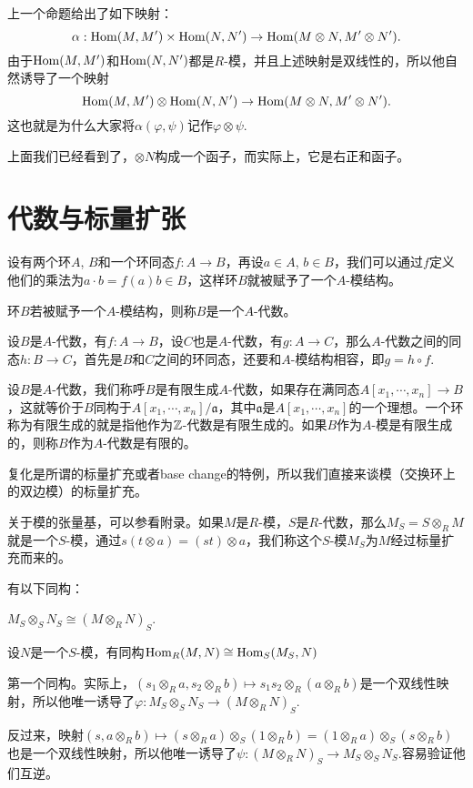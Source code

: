 \para 上一个命题给出了如下映射：
\[
	\alpha:\operatorname{Hom}(M,M')\times \operatorname{Hom}(N,N')\to \operatorname{Hom}(M\otimes N,M'\otimes N').
\]
由于$\operatorname{Hom}(M,M')$和$\operatorname{Hom}(N,N')$都是$R$-模，并且上述映射是双线性的，所以他自然诱导了一个映射
\[
	\operatorname{Hom}(M,M')\otimes \operatorname{Hom}(N,N')\to \operatorname{Hom}(M\otimes N,M'\otimes N').
\]
这也就是为什么大家将$\alpha(\varphi,\psi)$记作$\varphi\otimes \psi$. 

\para 上面我们已经看到了，$\otimes N$构成一个函子，而实际上，它是右正和函子。

\section{代数与标量扩张}

设有两个环$A$, $B$和一个环同态$f:A\to B$，再设$a\in A$, $b\in B$，我们可以通过$f$定义他们的乘法为$a\cdot b=f(a)b\in B$，这样环$B$就被赋予了一个$A$-模结构。

\para 环$B$若被赋予一个$A$-模结构，则称$B$是一个$A$-代数。

设$B$是$A$-代数，有$f:A\to B$，设$C$也是$A$-代数，有$g:A\to C$，那么$A$-代数之间的同态$h:B\to C$，首先是$B$和$C$之间的环同态，还要和$A$-模结构相容，即$g=h\circ f$.

\para 设$B$是$A$-代数，我们称呼$B$是有限生成$A$-代数，如果存在满同态$A[x_1,\cdots ,x_n]\to B$，这就等价于$B$同构于$A[x_1,\cdots ,x_n]/\mathfrak{a}$，其中$\mathfrak{a}$是$A[x_1,\cdots ,x_n]$的一个理想。一个环称为有限生成的就是指他作为$\mathbb{Z}$-代数是有限生成的。如果$B$作为$A$-模是有限生成的，则称$B$作为$A$-代数是有限的。

复化是所谓的标量扩充或者base change的特例，所以我们直接来谈模（交换环上的双边模）的标量扩充。

\para 关于模的张量基，可以参看附录。如果$M$是$R$-模，$S$是$R$-代数，那么$M_S=S\otimes_R M$就是一个$S$-模，通过$s(t\otimes a)=(st)\otimes a$，我们称这个$S$-模$M_S$为$M$经过标量扩充而来的。

\lem 有以下同构：

 $M_S\otimes_S N_S\cong (M\otimes_R N)_S$.

 设$N$是一个$S$-模，有同构$\operatorname{Hom}_R(M,N)\cong \operatorname{Hom}_S(M_S,N)$

\proof 第一个同构。实际上，$(s_1\otimes_R a,s_2\otimes_R b)\mapsto s_1s_2\otimes_R(a\otimes_R b)$是一个双线性映射，所以他唯一诱导了$\varphi:M_S\otimes_S N_S\to (M\otimes_R N)_S$.

反过来，映射$(s,a\otimes_R b)\mapsto (s\otimes_R a)\otimes_S (1\otimes_R b)=(1\otimes_R a)\otimes_S (s\otimes_R b)$也是一个双线性映射，所以他唯一诱导了$\psi:(M\otimes_R N)_S\to M_S\otimes_S N_S$.容易验证他们互逆。

